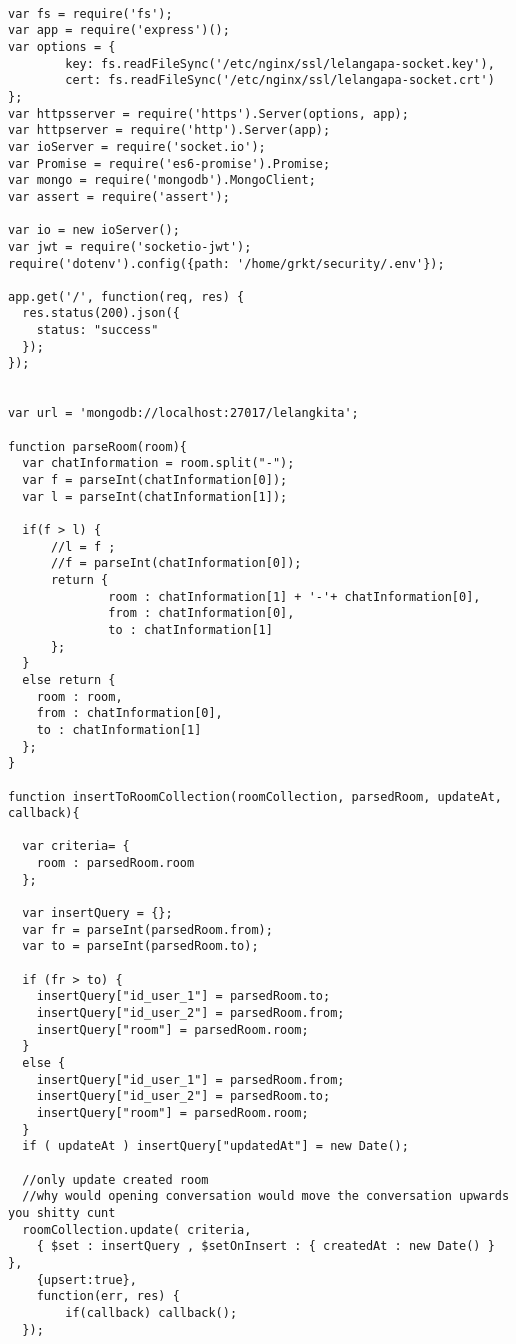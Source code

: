 \begin{lstlisting}[label=sc-socket-chat,style=htmlcssjs,caption= Implementasi Node.js + Socket.io untuk \textit{Chat}]

var fs = require('fs');
var app = require('express')();
var options = {
        key: fs.readFileSync('/etc/nginx/ssl/lelangapa-socket.key'),
        cert: fs.readFileSync('/etc/nginx/ssl/lelangapa-socket.crt')
};
var httpsserver = require('https').Server(options, app);
var httpserver = require('http').Server(app);
var ioServer = require('socket.io');
var Promise = require('es6-promise').Promise;
var mongo = require('mongodb').MongoClient;
var assert = require('assert');

var io = new ioServer();
var jwt = require('socketio-jwt');
require('dotenv').config({path: '/home/grkt/security/.env'});

app.get('/', function(req, res) {
  res.status(200).json({
    status: "success"
  });
});


var url = 'mongodb://localhost:27017/lelangkita';

function parseRoom(room){
  var chatInformation = room.split("-");
  var f = parseInt(chatInformation[0]);
  var l = parseInt(chatInformation[1]);

  if(f > l) {
      //l = f ;
      //f = parseInt(chatInformation[0]);
      return {
              room : chatInformation[1] + '-'+ chatInformation[0],
              from : chatInformation[0],
              to : chatInformation[1]
      };
  }
  else return {
    room : room,
    from : chatInformation[0],
    to : chatInformation[1]
  };
}

function insertToRoomCollection(roomCollection, parsedRoom, updateAt, callback){

  var criteria= {
    room : parsedRoom.room
  };

  var insertQuery = {};
  var fr = parseInt(parsedRoom.from);
  var to = parseInt(parsedRoom.to);

  if (fr > to) {
    insertQuery["id_user_1"] = parsedRoom.to;
    insertQuery["id_user_2"] = parsedRoom.from;
    insertQuery["room"] = parsedRoom.room;
  }
  else {
    insertQuery["id_user_1"] = parsedRoom.from;
    insertQuery["id_user_2"] = parsedRoom.to;
    insertQuery["room"] = parsedRoom.room;
  }
  if ( updateAt ) insertQuery["updatedAt"] = new Date();

  //only update created room
  //why would opening conversation would move the conversation upwards you shitty cunt
  roomCollection.update( criteria, 
    { $set : insertQuery , $setOnInsert : { createdAt : new Date() } }, 
    {upsert:true}, 
    function(err, res) {
        if(callback) callback();
  });


\end{lstlisting}
